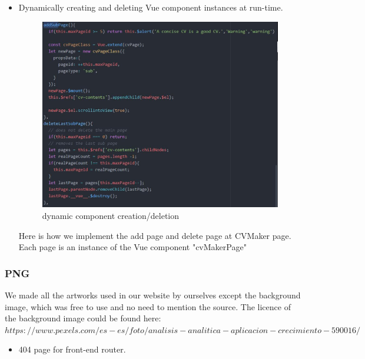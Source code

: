 \documentclass[11pt]{article}
\begin{document}
\begin{spacing}{1.0}
\begin{itemize}
	\item Dynamically creating and deleting Vue component instances at run-time.
	 \begin{figure}[H]
		\centering
		\includegraphics[scale=.5]{figures/js/addSubPage.jpg}
		\caption{dynamic component creation/deletion}

	\end{figure}
	Here is how we implement the add page and delete page at CVMaker page. Each page is an instance of the Vue component "cvMakerPage"
	
	\end{itemize}
	
	\subsubsection{PNG}
	We made all the artworks used in our website by ourselves except the background image, which was free to use and no need to mention the source.
	The licence of the background image could be found here:
	 $https://www.pexels.com/es-es/foto/analisis-analitica-aplicacion-crecimiento-590016/$
	 
	\begin{itemize}
	\item 404 page for front-end router.
	

\end{itemize}
\end{spacing}
\end{document}
